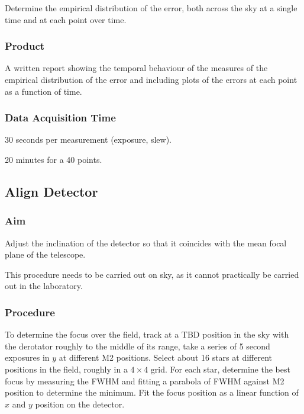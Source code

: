 \documentclass{article}
\begin{document}
Determine the empirical distribution of the error, both across the sky at a single time and at each point over time.

\subsubsection{Product}

A written report showing the temporal behaviour of the measures of the empirical distribution of the error and including plots of the errors at each point as a function of time.

\subsubsection{Data Acquisition Time}

30 seconds per measurement (exposure, slew).

20 minutes for a 40 points.


\subsection{Align Detector}

\subsubsection{Aim}

Adjust the inclination of the detector so that it coincides with the mean focal plane of the telescope.

This procedure needs to be carried out on sky, as it cannot practically be carried out in the laboratory.

\subsubsection{Procedure}

To determine the focus over the field, track at a TBD position in the sky with the derotator roughly to the middle of its range, take a series of 5 second exposures in $y$ at different M2 positions. Select about 16 stars at different positions in the field, roughly in a $4\times4$ grid. For each star, determine the best focus by measuring the FWHM and fitting a parabola of FWHM against M2 position to determine the minimum. Fit the focus position as a linear function of $x$ and $y$ position on the detector.
\end{document}

